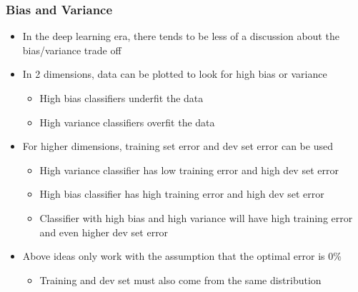 \documentclass[12pt, letterpaper]{article}
\begin{document}
    \subsubsection{Bias and Variance}
    \begin{itemize}
        \item In the deep learning era, there tends to be less of a discussion about the bias/variance trade off
        \item In 2 dimensions, data can be plotted to look for high bias or variance
        \begin{itemize}
            \item High bias classifiers underfit the data
            \item High variance classifiers overfit the data
        \end{itemize}
        \item For higher dimensions, training set error and dev set error can be used
        \begin{itemize}
            \item High variance classifier has low training error and high dev set error
            \item High bias classifier has high training error and high dev set error
            \item Classifier with high bias and high variance will have high training error and even higher dev set error
        \end{itemize}
        \item Above ideas only work with the assumption that the optimal error is 0\%
        \begin{itemize}
            \item Training and dev set must also come from the same distribution
        \end{itemize}
    \end{itemize}
\end{document}
